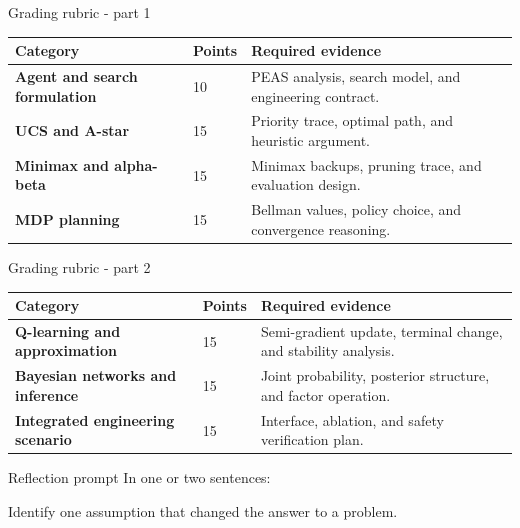 \documentclass[aspectratio=169,11pt]{beamer}
\begin{document}
\begin{frame}{Grading rubric - part 1}
\scriptsize
\begin{tabularx}{\textwidth}{>{\bfseries}p{} p{} X}
\toprule
Category & Points & Required evidence \\
\midrule
Agent and search formulation & 10 & PEAS analysis, search model, and engineering contract. \\
UCS and A-star & 15 & Priority trace, optimal path, and heuristic argument. \\
Minimax and alpha-beta & 15 & Minimax backups, pruning trace, and evaluation design. \\
MDP planning & 15 & Bellman values, policy choice, and convergence reasoning. \\
\bottomrule
\end{tabularx}
\end{frame}

\begin{frame}{Grading rubric - part 2}
\scriptsize
\begin{tabularx}{\textwidth}{>{\bfseries}p{} p{} X}
\toprule
Category & Points & Required evidence \\
\midrule
Q-learning and approximation & 15 & Semi-gradient update, terminal change, and stability analysis. \\
Bayesian networks and inference & 15 & Joint probability, posterior structure, and factor operation. \\
Integrated engineering scenario & 15 & Interface, ablation, and safety verification plan. \\
\bottomrule
\end{tabularx}
\end{frame}

\begin{frame}{Reflection prompt}
In one or two sentences:

Identify one assumption that changed the answer to a problem.
\end{frame}
\end{document}
